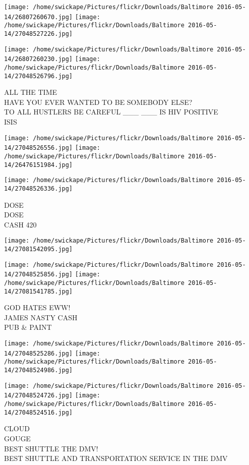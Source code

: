 \documentclass[10pt,letterpaper]{article}
\begin{document}
\texttt{[image: /home/swickape/Pictures/flickr/Downloads/Baltimore 2016-05-14/26807260670.jpg]}
\texttt{[image: /home/swickape/Pictures/flickr/Downloads/Baltimore 2016-05-14/27048527226.jpg]}

\texttt{[image: /home/swickape/Pictures/flickr/Downloads/Baltimore 2016-05-14/26807260230.jpg]}
\texttt{[image: /home/swickape/Pictures/flickr/Downloads/Baltimore 2016-05-14/27048526796.jpg]}

ALL THE TIME\\
HAVE YOU EVER WANTED TO BE SOMEBODY ELSE?\\
TO ALL HUSTLERS BE CAREFUL \_\_\_ \_\_\_ IS HIV POSITIVE\\
ISIS
\pagebreak

\texttt{[image: /home/swickape/Pictures/flickr/Downloads/Baltimore 2016-05-14/27048526556.jpg]}
\texttt{[image: /home/swickape/Pictures/flickr/Downloads/Baltimore 2016-05-14/26476151984.jpg]}

\texttt{[image: /home/swickape/Pictures/flickr/Downloads/Baltimore 2016-05-14/27048526336.jpg]}

DOSE\\
DOSE\\
CASH 420
\pagebreak

\texttt{[image: /home/swickape/Pictures/flickr/Downloads/Baltimore 2016-05-14/27081542095.jpg]}

\vspace{0.25in}
\texttt{[image: /home/swickape/Pictures/flickr/Downloads/Baltimore 2016-05-14/27048525856.jpg]}
\texttt{[image: /home/swickape/Pictures/flickr/Downloads/Baltimore 2016-05-14/27081541785.jpg]}

GOD HATES EWW!\\
JAMES NASTY CASH\\
PUB \& PAINT
\pagebreak

\texttt{[image: /home/swickape/Pictures/flickr/Downloads/Baltimore 2016-05-14/27048525286.jpg]}
\texttt{[image: /home/swickape/Pictures/flickr/Downloads/Baltimore 2016-05-14/27048524986.jpg]}

\texttt{[image: /home/swickape/Pictures/flickr/Downloads/Baltimore 2016-05-14/27048524726.jpg]}
\texttt{[image: /home/swickape/Pictures/flickr/Downloads/Baltimore 2016-05-14/27048524516.jpg]}

CLOUD\\
GOUGE\\
BEST SHUTTLE THE DMV!\\
BEST SHUTTLE AND TRANSPORTATION SERVICE IN THE DMV
\pagebreak
\end{document}
